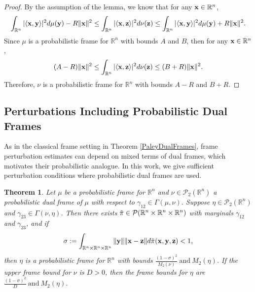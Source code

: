 \documentclass{amsart}
\numberwithin{equation}{section}
\theoremstyle{plain}
\newtheorem{theorem}{Theorem}[section]
\theoremstyle{definition}
\begin{document}
\begin{proof}
    By the assumption of the lemma, we know that for any ${\bf x} \in \mathbb{R}^n$, 
\begin{equation*}
      \int_{\mathbb{R}^n} |\langle {\bf x}, {\bf y} \rangle|^2  d\mu({\bf y}) -R \Vert  {\bf x} \Vert^2  \leq \int_{\mathbb{R}^n} |\langle {\bf x}, {\bf z} \rangle|^2 d\nu({\bf z})  \leq  \int_{\mathbb{R}^n} |\langle {\bf x}, {\bf y} \rangle|^2  d\mu({\bf y})+ R    \Vert  {\bf x} \Vert^2.
    \end{equation*}
Since $\mu$ is a probabilistic frame for $\mathbb{R}^n$ with bounds $A$ and $B$, then for any ${\bf x} \in \mathbb{R}^n$,
\begin{equation*}
      (A-R) \Vert  {\bf x} \Vert^2   \leq \int_{\mathbb{R}^n} |\langle {\bf x}, {\bf z} \rangle|^2 d\nu({\bf z})  \leq  (B + R)    \Vert  {\bf x} \Vert^2 . 
    \end{equation*} 
    Therefore, $\nu$ is a probabilistic frame for $\mathbb{R}^n$ with bounds $A-R$ and $B+R$. 
\end{proof}



\subsection{Perturbations Including Probabilistic Dual Frames}\label{TransportDual} As in the classical frame setting in Theorem \ref{PaleyDualFrames}, frame perturbation estimates can depend on mixed terms of dual frames, which motivates their probabilistic analogue. In this work, we give sufficient perturbation conditions where probabilistic dual frames are used.
\begin{theorem}\label{StabilityPDualFrame}
 Let $\mu$ be a probabilistic frame for $\mathbb{R}^n$ and $\nu \in \mathcal{P}_2(\mathbb{R}^n)$ a probabilistic dual frame of $\mu$ with respect to $\gamma_{12} \in \Gamma(\mu, \nu)$. Suppose $\eta \in \mathcal{P}_2(\mathbb{R}^n)$ and $\gamma_{23} \in \Gamma(\nu, \eta)$. Then there exists $ \Tilde{\pi} \in \mathcal{P}(\mathbb{R}^n \times \mathbb{R}^n \times \mathbb{R}^n)$ with marginals $\gamma_{12}$ and $\gamma_{23}$, and if
 \begin{equation*}
     \sigma:= \int_{\mathbb{R}^n \times \mathbb{R}^n \times \mathbb{R}^n}  \Vert {\bf y} \Vert  \Vert {\bf x}-{\bf z} \Vert d\Tilde{\pi}({\bf x},{\bf y},{\bf z}) <1,
 \end{equation*}
then $\eta$ is a probabilistic frame for $\mathbb{R}^n$ with bounds $ \frac{(1- \sigma)^2}{M_2(\nu)} \ \text{and} \  M_2(\eta)$.
If the upper frame bound for $\nu$ is $D>0$, then the frame bounds for $\eta$ are $\frac{(1- \sigma)^2}{D} \ \text{and} \  M_2(\eta)$.

 \end{theorem}
 
\end{document}
